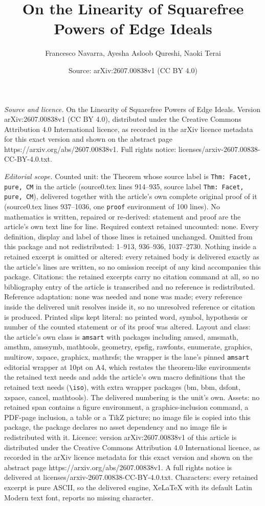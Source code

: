 \documentclass[10pt,a4paper]{amsart}
\title[On the Linearity of Squarefree Powers of Edge Ideals]{On the Linearity of Squarefree Powers of Edge Ideals}
\author{Francesco Navarra, Ayesha Asloob Qureshi, Naoki Terai}
\date{Source: arXiv:2607.00838v1 (CC BY 4.0)}
\begin{document}
\maketitle

\noindent\emph{Source and licence.} On the Linearity of Squarefree Powers of Edge Ideals. Version arXiv:2607.00838v1 (CC BY 4.0), distributed under the Creative Commons Attribution 4.0 International licence, as recorded in the arXiv licence metadata for this exact version and shown on the abstract page https://arxiv.org/abs/2607.00838v1. Full rights notice: licenses/arxiv-2607.00838-CC-BY-4.0.txt.\par\smallskip

\noindent\textit{Editorial scope.} Counted unit: the Theorem whose source label is \texttt{Thm: Facet, pure, CM} in the article (source0.tex lines 914--935, source label \texttt{Thm: Facet, pure, CM}), delivered together with the article's own complete original proof of it (source0.tex lines 937--1036, one \texttt{proof} environment of 100 lines). No mathematics is written, repaired or re-derived: statement and proof are the article's own text line for line. Required context retained uncounted: none. Every definition, display and label of those lines is retained unchanged. Omitted from this package and not redistributed: 1--913, 936--936, 1037--2730. Nothing inside a retained excerpt is omitted or altered: every retained body is delivered exactly as the article's lines are written, so no omission receipt of any kind accompanies this package. Citations: the retained excerpts carry no citation command at all, so no bibliography entry of the article is transcribed and no reference is redistributed. Reference adaptation: none was needed and none was made; every reference inside the delivered unit resolves inside it, so no unresolved reference or citation is produced. Printed slips kept literal: no printed word, symbol, hypothesis or number of the counted statement or of its proof was altered. Layout and class: the article's own class is \texttt{amsart} with packages including amscd, amsmath, amsthm, amssymb, mathtools, geometry, epsfig, rawfonts, enumerate, graphics, multirow, xspace, graphicx, mathrsfs; the wrapper is the lane's pinned \texttt{amsart} editorial wrapper at 10pt on A4, which restates the theorem-like environments the retained text needs and adds the article's own macro definitions that the retained text needs (\texttt{\textbackslash iso}), with extra wrapper packages (bm, bbm, dsfont, xspace, cancel, mathtools). The delivered numbering is the unit's own. Assets: no retained span contains a figure environment, a graphics-inclusion command, a PDF-page inclusion, a table or a TikZ picture; no image file is copied into this package, the package declares no asset dependency and no image file is redistributed with it. Licence: version arXiv:2607.00838v1 of this article is distributed under the Creative Commons Attribution 4.0 International licence, as recorded in the arXiv licence metadata for this exact version and shown on the abstract page https://arxiv.org/abs/2607.00838v1. A full rights notice is delivered at licenses/arxiv-2607.00838-CC-BY-4.0.txt. Characters: every retained excerpt is pure ASCII, so the delivered engine, XeLaTeX with its default Latin Modern text font, reports no missing character.
\end{document}
